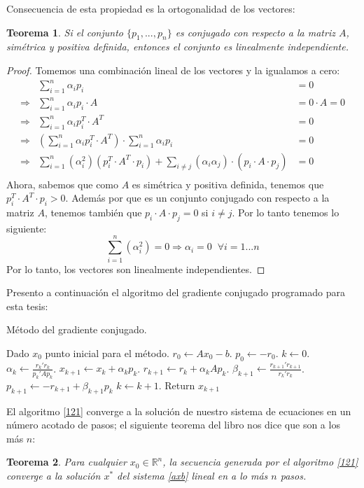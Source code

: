 \documentclass[12pt,spanish,oneside]{book}
\theoremstyle{plain}
\newtheorem{teo}{Teorema}[chapter]
\numberwithin{equation}{chapter}
\theoremstyle{definition}
\theoremstyle{remark}
\newcommand{\re}{\mathbb{R}}
\begin{document}
Consecuencia de esta propiedad es la ortogonalidad de los vectores: \begin{teo} \label{teogc} Si el conjunto $\lbrace p_1,...,p_n\rbrace$ es conjugado con respecto a la matriz $A$, simétrica y positiva definida, entonces el conjunto es linealmente independiente. \end{teo} 
\begin{proof} Tomemos una combinación lineal de los vectores y la igualamos a cero: 
\begin{eqnarray*} 
		&\sum_{i=1}^n\alpha_ip_i &=0 \\
\Rightarrow &\sum_{i=1}^n\alpha_ip_i\cdot A &=0 \cdot A=0\\ 
\Rightarrow &\sum_{i=1}^n\alpha_ip_i^T\cdot A^T &=0 \\
\Rightarrow & \left(\sum_{i=1}^n\alpha_ip_i^T\cdot A^T\right)\cdot \sum_{i=1}^n\alpha_ip_i &=0 \\
\Rightarrow &\sum_{i=1}^n\left(\alpha_i^2\right)\left(p_i^T\cdot A^T\cdot p_i\right)+\sum_{i\neq j}\left(\alpha_i\alpha_j\right)\cdot \left(p_i\cdot A\cdot p_j \right)&=0 \\
\end{eqnarray*}
Ahora, sabemos que como $A$ es simétrica y positiva definida, tenemos que $p_i^T\cdot A^T\cdot p_i>0$. Además por que es un conjunto conjugado con respecto a la matriz $A$, tenemos también que $p_i\cdot A\cdot p_j=0$ si $i\neq j$. Por lo tanto tenemos lo siguiente: 
\[ \sum_{i=1}^n\left(\alpha_i^2\right)=0\Rightarrow \alpha_i=0 \phantom{\pi} \forall i=1...n\]
Por lo tanto, los vectores son linealmente independientes.
\end{proof}
Presento a continuación el algoritmo del gradiente conjugado programado para esta tesis:

\begin{algorithm}[H]
\caption{Método del gradiente conjugado.}
\label{121}
\begin{algorithmic}[1]
    \State Dado $x_0$ punto inicial para el método.
    \State $r_0\leftarrow Ax_0-b$.
    \State $p_0\leftarrow -r_0$.
    \State $k\leftarrow 0$.
        \State $\alpha_k \leftarrow \frac{r_k'r_k}{p_k'Ap_k}$.
        \State $x_{k+1} \leftarrow x_k + \alpha_kp_k$.
        \State $r_{k+1}\leftarrow r_k+\alpha_kAp_k$.
        \State $\beta_{k+1}\leftarrow \frac{r_{k+1}'r_{k+1}}{r_{k}'r_{k}}$.
        \State $p_{k+1} \leftarrow -r_{k+1}+\beta_{k+1}p_k$
        \State $k\leftarrow k+1$.
	\EndWhile
	\State Return $x_{k+1}$
\end{algorithmic}
\end{algorithm}
El algoritmo \ref{121} converge a la solución de nuestro sistema de ecuaciones en un número acotado de pasos; el siguiente teorema del libro \cite{Nocedal} nos dice que son a los más $n$: \begin{teo}Para cualquier $x_0\in\re^n$, la secuencia generada por el algoritmo \ref{121} converge a la solución $x^*$ del sistema \ref{axb} lineal en a lo más $n$ pasos. \end{teo}
\end{document}
